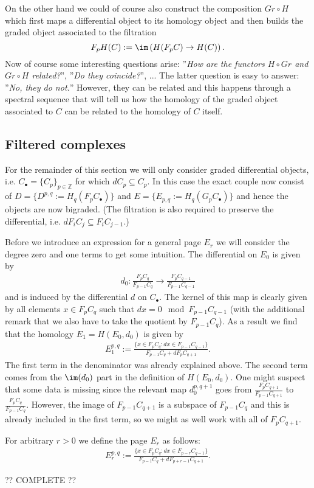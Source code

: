 	On the other hand we could of course also construct the composition $Gr\circ H$ which first maps a differential object to its homology object and then builds the graded object associated to the filtration \[F_pH(C):=\im\left(H(F_pC)\rightarrow H(C)\right).\] Now of course some interesting questions arise: ''\textit{How are the functors $H\circ Gr$ and $Gr\circ H$ related?}'', ''\textit{Do they coincide?}'', ... The latter question is easy to answer: ''\textit{No, they do not.}'' However, they can be related and this happens through a spectral sequence that will tell us how the homology of the graded object associated to $C$ can be related to the homology of $C$ itself.

\subsection{Filtered complexes}

	For the remainder of this section we will only consider graded differential objects, i.e. $C_\bullet=\{C_p\}_{p\in\mathbb{Z}}$ for which $dC_p\subseteq C_p$. In this case the exact couple now consist of $D=\{D^{p,q}:=H_q(F_pC_\bullet)\}$ and $E=\{E_{p,q}:=H_q(G_pC_\bullet)\}$ and hence the objects are now bigraded. (The filtration is also required to preserve the differential, i.e. $dF_iC_j\subseteq F_iC_{j-1}$.)


	Before we introduce an expression for a general page $E_r$ we will consider the degree zero and one terms to get some intuition. The differential on $E_0$ is given by
	\begin{gather}
		d_0:\frac{F_pC_q}{F_{p-1}C_q}\rightarrow\frac{F_pC_{q-1}}{F_{p-1}C_{q-1}}
	\end{gather}
	and is induced by the differential $d$ on $C_\bullet$. The kernel of this map is clearly given by all elements $x\in F_pC_q$ such that $dx = 0\mod F_{p-1}C_{q-1}$ (with the additional remark that we also have to take the quotient by $F_{p-1}C_q$). As a result we find that the homology $E_1=H(E_0, d_0)$ is given by
	\begin{gather}
		E_1^{p,q}:=\frac{\{x\in F_pC_q: dx\in F_{p-1}C_{q-1}\}}{F_{p-1}C_q+dF_pC_{q+1}}.
	\end{gather}
	The first term in the denominator was already explained above. The second term comes from the $\im(d_0)$ part in the definition of $H(E_0, d_0)$. One might suspect that some data is missing since the relevant map $d_0^{p, q+1}$ goes from $\frac{F_pC_{q+1}}{F_{p-1}C_{q+1}}$ to $\frac{F_pC_q}{F_{p-1}C_{q}}$. However, the image of $F_{p-1}C_{q+1}$ is a subspace of $F_{p-1}C_q$ and this is already included in the first term, so we might as well work with all of $F_pC_{q+1}$.

	For arbitrary $r>0$ we define the page $E_r$ as follows:
	\begin{gather}
	E_r^{p,q}:=\frac{\{x\in F_pC_q: dx\in F_{p-r}C_{q-1}\}}{F_{p-1}C_q+dF_{p+r-1}C_{q+1}}.
	\end{gather}

    ?? COMPLETE ??